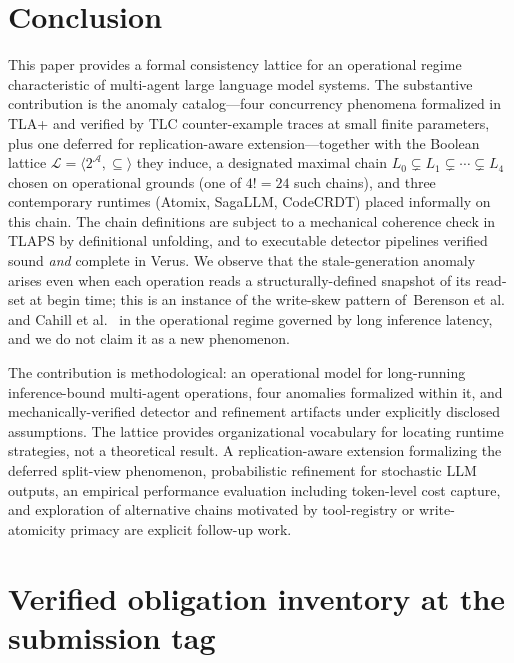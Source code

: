 \documentclass[journal,compsoc,10pt]{IEEEtran}
\theoremstyle{definition}
\theoremstyle{remark}
\begin{document}
\section{Conclusion}
\label{sec:conclusion}

This paper provides a formal consistency lattice for an operational
regime characteristic of multi-agent large language model systems.
The substantive contribution is the anomaly catalog---four
concurrency phenomena formalized in TLA+ and verified by TLC
counter-example traces at small finite parameters, plus one deferred
for replication-aware extension---together with the Boolean lattice
$\mathcal{L} = \langle 2^{\mathcal{A}}, \subseteq \rangle$ they
induce, a designated maximal chain $L_0 \subsetneq L_1 \subsetneq
\cdots \subsetneq L_4$ chosen on operational grounds (one of $4! = 24$
such chains), and three contemporary runtimes (Atomix, SagaLLM,
CodeCRDT) placed informally on this chain. The chain definitions
are subject to a mechanical coherence check in TLAPS by definitional
unfolding, and to executable detector pipelines verified
sound \emph{and} complete in Verus. We observe that the stale-generation
anomaly arises even when each operation reads a structurally-defined
snapshot of its read-set at begin time; this is an instance of the
write-skew pattern of~Berenson et al. and Cahill et al.~\cite{BerensonEtAl1995,CahillRohmFekete2008SSI}
in the operational regime governed by long inference latency, and
we do not claim it as a new phenomenon.

The contribution is methodological: an operational model for
long-running inference-bound multi-agent operations, four anomalies
formalized within it, and mechanically-verified detector and
refinement artifacts under explicitly disclosed assumptions. The
lattice provides organizational vocabulary for locating runtime
strategies, not a theoretical result. A replication-aware extension
formalizing the deferred split-view phenomenon, probabilistic
refinement for stochastic LLM outputs, an empirical performance
evaluation including token-level cost capture, and exploration of
alternative chains motivated by tool-registry or write-atomicity
primacy are explicit follow-up work.

\appendix
\section{Verified obligation inventory at the submission tag}
\label{app:obligations}
\end{document}
